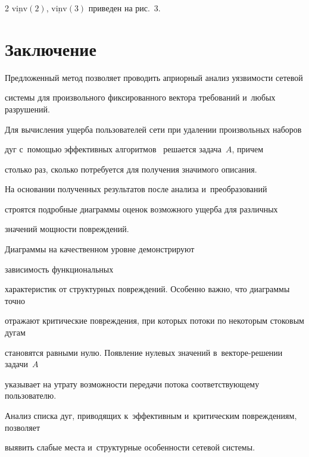 \begin{multicols}{2}
$\underline {\mathrm{vinv}}(2)$, $\underline {\mathrm{vinv}}(3)$ приведен на рис.~3.





\vspace*{-6pt}





\section{Заключение}





Предложенный метод позволяет проводить априорный анализ уязвимости сетевой 


системы для произвольного фиксированного вектора требований и~любых разрушений.


Для вычисления ущерба  пользователей сети при  удалении произвольных наборов   


дуг с~помощью эффективных алгоритмов~\cite{Yen} решается задача~$A$, причем 


столько раз, сколько потребуется для получения значимого описания.  





На основании полученных   результатов после анализа и~преобразований  


строятся  подробные  диаграм\-мы  оценок  возможного  ущерба для различных  


значений мощности повреждений.


Диаграммы на качественном уровне демонстрируют\linebreak


 зависимость функциональных 


характеристик от структурных повреждений. Особенно важно,  что  диаграммы точно 


отражают критические по\-вреж\-де\-ния, при которых потоки по некоторым стоковым дугам 


становятся равными нулю. Появление   нулевых значений в~век\-то\-ре-ре\-ше\-нии  задачи~$A$  


указывает на утрату  возможности передачи потока соответствующему пользователю.  


Анализ списка дуг, приводящих к~эффективным и~критическим повреждениям, позволяет 


выявить  слабые места и~структурные особенности сетевой системы.



\end{multicols}

